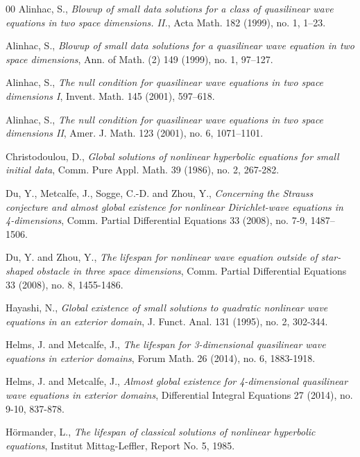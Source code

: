 \documentclass[11pt, reqno]{amsart}
\theoremstyle{definition}
\theoremstyle{remark}
\theoremstyle{definition}
\numberwithin{equation}{section}
\numberwithin{equation}{section}
\begin{document}
\begin{thebibliography}{00}
{Alinhac, S.}, \textit{\emph Blowup of small data solutions for a class
of quasilinear wave equations in two space dimensions. II.}, Acta Math. 182 (1999), no. 1, 1--23.

{Alinhac, S.}, \textit{\emph Blowup of small data solutions for a quasilinear wave equation
in two space dimensions},  Ann. of Math. (2) 149 (1999), no. 1, 97--127.

{Alinhac, S.}, \textit{\emph The null condition for quasilinear wave
equations in two space dimensions I}, Invent. Math. 145 (2001),
597--618.

{Alinhac, S.}, \textit{\emph The null condition for quasilinear wave
equations in two space dimensions II}, Amer. J. Math. 123 (2001),
no. 6, 1071--1101.

{Christodoulou, D.}, \textit{\emph Global solutions of nonlinear hyperbolic equations for small initial data}, Comm. Pure Appl. Math. 39 (1986), no. 2, 
267-282.


{Du, Y., Metcalfe, J., Sogge, C.-D. and Zhou, Y.}, \textit{\emph Concerning the
Strauss conjecture and almost global existence for nonlinear Dirichlet-wave
equations in 4-dimensions}, Comm. Partial Differential Equations 33 (2008),
no. 7-9, 1487--1506.

{Du, Y. and Zhou, Y.}, \textit{\emph The lifespan for nonlinear wave equation outside of star-shaped obstacle in three space dimensions}, Comm. Partial 
Differential Equations 33 (2008),
no. 8, 1455-1486.

{Hayashi, N.}, \textit{\emph  Global existence of small solutions to quadratic nonlinear wave equations in an
exterior domain}, J. Funct. Anal. 131 (1995), no. 2, 302-344.

{Helms, J. and Metcalfe, J.}, \textit{\emph  The lifespan for 3-dimensional quasilinear wave equations in exterior domains}, Forum Math. 26 (2014), no. 6, 
1883-1918.

{Helms, J. and Metcalfe, J.}, \textit{\emph  Almost global existence for 4-dimensional quasilinear wave equations in exterior domains}, Differential Integral 
Equations 27 (2014), no. 9-10, 837-878.

{H\"{o}rmander, L.}, \textit{\emph  The lifespan of classical solutions of nonlinear hyperbolic equations}, Institut Mittag-Leffler, Report No. 5, 1985.



\end{thebibliography}
\end{document}
